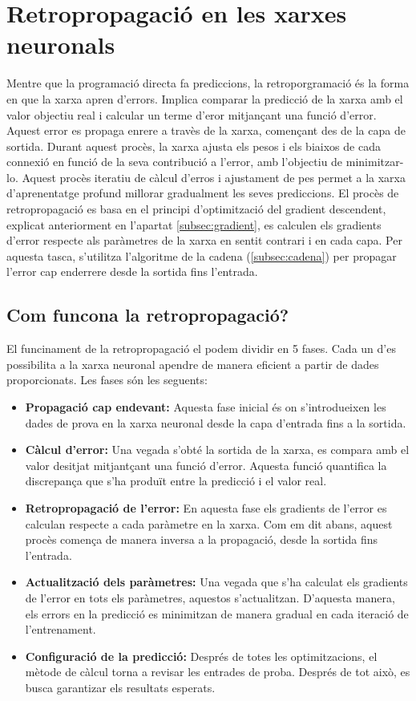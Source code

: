 {\section{Retropropagació en les xarxes neuronals}\label{subsec:retropropagació}
Mentre que la programació directa fa prediccions, la retroporgramació és la forma en que la xarxa apren d'errors. Implica comparar la predicció de la xarxa amb el valor objectiu real i calcular un terme d'eror mitjançant una funció d'error.
Aquest error es propaga enrere a travès de la xarxa, començant des de la capa de sortida. Durant aquest procès, la xarxa ajusta els pesos i els biaixos de cada connexió en funció de la seva contribució a l'error, amb l'objectiu de minimitzar-lo.
Aquest procès iteratiu de càlcul d'erros i ajustament de pes permet a la xarxa d'aprenentatge profund millorar gradualment les seves prediccions.
El procès de retropropagació es basa en el principi d'optimització del gradient descendent, explicat anteriorment en l'apartat \ref{subsec:gradient}, es calculen els gradients d'error respecte als paràmetres de la xarxa en sentit contrari i en cada capa. Per aquesta tasca, s'utilitza l'algoritme de la cadena (\ref{subsec:cadena}) per propagar l'error cap enderrere desde la sortida fins l'entrada.

\subsection{Com funcona la retropropagació?}
El funcinament de la retropropagació el podem dividir en 5 fases. Cada un d'es possibilita a la xarxa neuronal apendre de manera eficient a partir de dades proporcionats. Les fases són les seguents:
\begin{itemize}
 \item \textbf{Propagació cap endevant:} Aquesta fase inicial és on s'introdueixen les dades de prova en la xarxa neuronal desde la capa d'entrada fins a la sortida.
 \item \textbf{Càlcul d'error:} Una vegada s'obté la sortida de la xarxa, es compara amb el valor desitjat mitjantçant una funció d'error. Aquesta funció quantifica la discrepança que s'ha produït entre la predicció i el valor real.
 \item \textbf{Retropropagació de l'error:} En aquesta fase els gradients de l'error es calculan respecte a cada paràmetre en la xarxa. Com em dit abans, aquest procès comença de manera inversa a la propagació, desde la sortida fins l'entrada.
 \item \textbf{Actualització dels paràmetres:} Una vegada que s'ha calculat els gradients de l'error en tots els paràmetres, aquestos s'actualitzan. D'aquesta manera, els errors en la predicció es minimitzan de manera gradual en cada iteració de l'entrenament.
 \item \textbf{Configuració de la predicció:} Després de totes les optimitzacions, el mètode de càlcul torna a revisar les entrades de proba. Després de tot això, es busca garantizar els resultats esperats.
\end{itemize}
}
